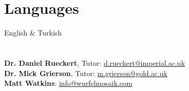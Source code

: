 \documentclass[margin,line,a4paper]{resume}
\begin{document}
\begin{resume}
\section{\mysidestyle Languages}

English \& Turkish

\section{}

\hypersetup{urlcolor=Fuchsia}
%
\textbf{Dr. Daniel Rueckert}, Tutor: \href{mailto:d.rueckert@imperial.ac.uk}{d.rueckert@imperial.ac.uk}
\vspace{2mm} \\
\textbf{Dr. Mick Grierson}, Tutor: \href{mailto:m.grierson@gold.ac.uk}{m.grierson@gold.ac.uk}
\vspace{2mm} \\
\textbf{Matt Watkins}: \href{info@wurfelmosaik.com}{info@wurfelmosaik.com}
\vspace{2mm} \\

\end{resume}
\end{document}
